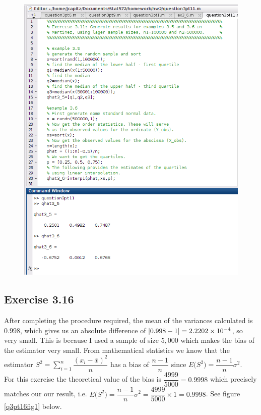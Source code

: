 \documentclass[12pt,a4paper]{article}
\begin{document}
\begin{figure}[ht!]
\begin{center}
\includegraphics[scale=.60]{q3pt11_code.png}
\caption{}
\label{q3pt11fig1}
\end{center}
\end{figure}
\FloatBarrier

\subsection*{Exercise 3.16}

After completing the procedure required, the mean of the variances calculated is $0.998$, which gives us an absolute difference of  $\abs{0.998-1}=2.2202 \times 10^{-4}$, so very small. This is because I used a sample of size $5,000$ which makes the bias of the estimator very small. From mathematical statistics we know that the estimator  $S^2=\displaystyle\sum_{i=1}^n\dfrac{(x_i-\bar{x})^2}{n}$ has a bias of $\dfrac{n-1}{n}$ since $E\bigr(S^2\bigr)=\dfrac{n-1}{n}\sigma^2$.\\
For this exercise the theoretical value of the bias is $\dfrac{4999}{5000}=0.9998$ which precisely matches our our result, i.e. $E\bigr(S^2\bigr)=\dfrac{n-1}{n}\sigma^2=\dfrac{4999}{5000}\times1=0.9998$. See figure \ref{q3pt16fig1} below.
\end{document}
